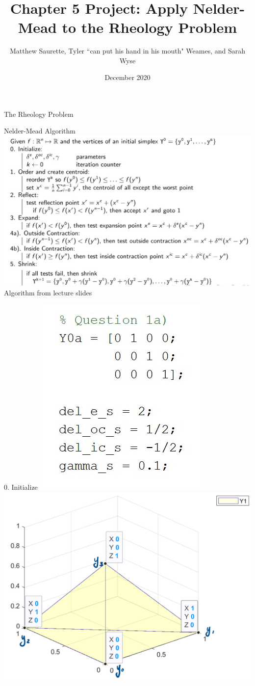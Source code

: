 \documentclass{beamer}
\title[Nelder-Mead on the Rheology Problem]{Chapter 5 Project: Apply Nelder-Mead to the Rheology Problem}
\author[Matthew, Tyler, and Sarah]{Matthew Saurette, Tyler ``can put his hand in his mouth" Weames, and Sarah Wyse}
\institute[Math 462]{Math 462\\ University of British Columbia - Okanagan}
\date{December 2020}
\begin{document}
\maketitle


\begin{frame}{The Rheology Problem}


\end{frame}

\begin{frame}{Nelder-Mead Algorithm}
    \centering
    \includegraphics[width=0.95\linewidth]{NMAlgorithm}\\
    \tiny
	\hfill Algorithm from lecture slides    
\end{frame}

\begin{frame}{0. Initialize}
	\centering
	\includegraphics[width=0.35\linewidth]{Initialize}
	\includegraphics[width=0.59\linewidth]{InitializeFig}
\end{frame}
\end{document}
